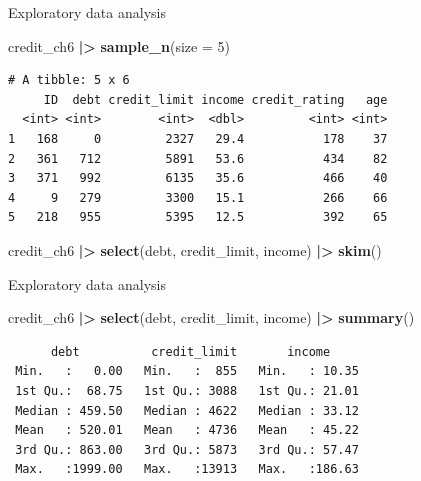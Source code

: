 \documentclass[
  ignorenonframetext,
]{beamer}
\newenvironment{Shaded}{\begin{snugshade}}{\end{snugshade}}
\newcommand{\AttributeTok}[1]{\textcolor[rgb]{0.13,0.29,0.53}{#1}}
\newcommand{\DecValTok}[1]{\textcolor[rgb]{0.00,0.00,0.81}{#1}}
\newcommand{\FunctionTok}[1]{\textcolor[rgb]{0.13,0.29,0.53}{\textbf{#1}}}
\newcommand{\NormalTok}[1]{#1}
\newcommand{\SpecialCharTok}[1]{\textcolor[rgb]{0.81,0.36,0.00}{\textbf{#1}}}
\begin{document}
\begin{frame}[fragile]{Exploratory data analysis}
\protect\hypertarget{exploratory-data-analysis-15}{}
\normalsize

\begin{Shaded}
\begin{Highlighting}[]
\NormalTok{credit\_ch6 }\SpecialCharTok{|\textgreater{}} 
  \FunctionTok{sample\_n}\NormalTok{(}\AttributeTok{size =} \DecValTok{5}\NormalTok{)}
\end{Highlighting}
\end{Shaded}

\begin{verbatim}
# A tibble: 5 x 6
     ID  debt credit_limit income credit_rating   age
  <int> <int>        <int>  <dbl>         <int> <int>
1   168     0         2327   29.4           178    37
2   361   712         5891   53.6           434    82
3   371   992         6135   35.6           466    40
4     9   279         3300   15.1           266    66
5   218   955         5395   12.5           392    65
\end{verbatim}

\normalsize

\normalsize

\begin{Shaded}
\begin{Highlighting}[]
\NormalTok{credit\_ch6 }\SpecialCharTok{|\textgreater{}} 
  \FunctionTok{select}\NormalTok{(debt, credit\_limit, income) }\SpecialCharTok{|\textgreater{}} 
  \FunctionTok{skim}\NormalTok{()}
\end{Highlighting}
\end{Shaded}
\end{frame}

\begin{frame}[fragile]{Exploratory data analysis}
\protect\hypertarget{exploratory-data-analysis-16}{}
\normalsize

\begin{Shaded}
\begin{Highlighting}[]
\NormalTok{credit\_ch6 }\SpecialCharTok{|\textgreater{}} 
  \FunctionTok{select}\NormalTok{(debt, credit\_limit, income) }\SpecialCharTok{|\textgreater{}} 
  \FunctionTok{summary}\NormalTok{()}
\end{Highlighting}
\end{Shaded}

\begin{verbatim}
      debt          credit_limit       income      
 Min.   :   0.00   Min.   :  855   Min.   : 10.35  
 1st Qu.:  68.75   1st Qu.: 3088   1st Qu.: 21.01  
 Median : 459.50   Median : 4622   Median : 33.12  
 Mean   : 520.01   Mean   : 4736   Mean   : 45.22  
 3rd Qu.: 863.00   3rd Qu.: 5873   3rd Qu.: 57.47  
 Max.   :1999.00   Max.   :13913   Max.   :186.63  
\end{verbatim}

\normalsize
\end{frame}
\end{document}
